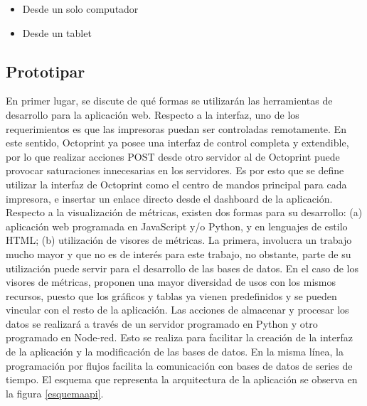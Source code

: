 \begin{itemize}
\item Desde un solo computador
\item Desde un tablet

\end{itemize}




\subsection{Prototipar}

En primer lugar, se discute de qué formas se utilizarán las herramientas de desarrollo para la aplicación web. Respecto a la interfaz, uno de los requerimientos es que las impresoras puedan ser controladas remotamente. En este sentido, Octoprint ya posee una interfaz de control completa y extendible, por lo que realizar acciones POST desde otro servidor al de Octoprint puede provocar saturaciones innecesarias en los servidores. Es por esto que se define utilizar la interfaz de Octoprint como el centro de mandos principal para cada impresora, e insertar un enlace directo desde el dashboard de la aplicación. Respecto a la visualización de métricas, existen dos formas para su desarrollo: (a) aplicación web programada en JavaScript y/o Python, y en lenguajes de estilo HTML; (b) utilización de visores de métricas. La primera, involucra un trabajo mucho mayor y que no es de interés para este trabajo, no obstante, parte de su utilización puede servir para el desarrollo de las bases de datos. En el caso de los visores de métricas, proponen una mayor diversidad de usos con los mismos recursos, puesto que los gráficos y tablas ya vienen predefinidos y se pueden vincular con el resto de la aplicación. Las acciones de almacenar y procesar los datos se realizará a través de un servidor programado en Python y otro programado en Node-red. Esto se realiza para facilitar la creación de la interfaz de la aplicación y la modificación de las bases de datos. En la misma línea, la programación por flujos facilita la comunicación con bases de datos de series de tiempo. El esquema que representa la arquitectura de la aplicación se observa en la figura \ref{esquemaapi}.

